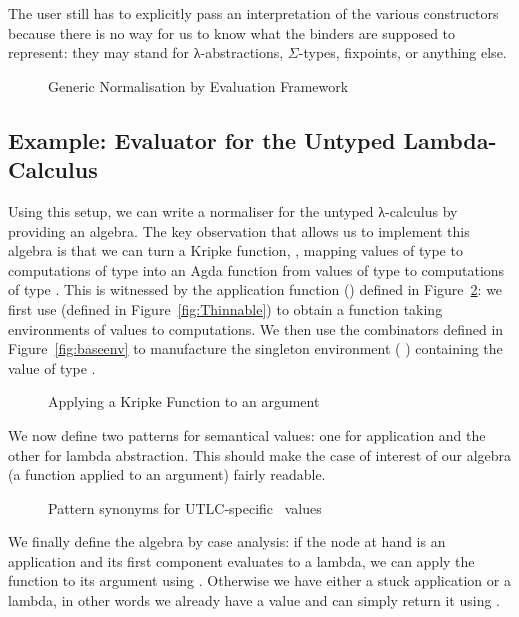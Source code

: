 The user still has to explicitly pass an interpretation of
the various constructors because there is no way for us to
know what the binders are supposed to represent: they may
stand for λ-abstractions, $\Sigma$-types, fixpoints, or
anything else.

\begin{figure}[h]
\caption{Generic Normalisation by Evaluation Framework\label{defn:NbE}}
\end{figure}

\subsection{Example: Evaluator for the Untyped Lambda-Calculus}

Using this setup, we can write a normaliser for the untyped λ-calculus
by providing an algebra. The key observation that allows us to implement
this algebra is that we can turn a Kripke function, , mapping values
of type  to computations of type  into an Agda function from
values of type  to computations of type . This is witnessed
by the application function (\AF{\_\$\$\_}) defined in Figure~\ref{fig:kripkeapp}:
we first use  (defined in Figure~\ref{fig:Thinnable}) to obtain
a function taking environments of values to computations. We then use the
combinators defined in Figure~\ref{fig:baseenv} to manufacture the singleton
environment {(  )} containing the value  of type
.

\begin{figure}[h]
\caption{Applying a Kripke Function to an argument}\label{fig:kripkeapp}
\end{figure}

We now define two patterns for semantical values: one for application and
the other for lambda abstraction. This should make the case of interest of
our algebra (a function applied to an argument) fairly readable.

\begin{figure}[h]
\caption{Pattern synonyms for UTLC-specific ~values}
\end{figure}

We finally define the algebra by case analysis: if the node at hand is an
application and its first component evaluates to a lambda, we can apply
the function to its argument using \AF{\_\$\$\_}. Otherwise we have either a
stuck application or a lambda, in other words we already have a value and can
simply return it using .

